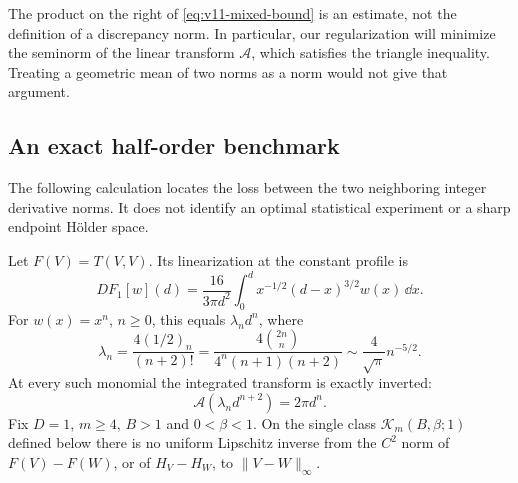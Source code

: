 The product on the right of \eqref{eq:v11-mixed-bound} is an estimate,
not the definition of a discrepancy norm. In particular, our
regularization will minimize the seminorm of the linear transform
$\mathscr A$, which satisfies the triangle inequality. Treating a
geometric mean of two norms as a norm would not give that argument.

\subsection{An exact half-order benchmark}
The following calculation locates the loss between the two neighboring
integer derivative norms. It does not identify an optimal statistical
experiment or a sharp endpoint H\"older space.

\begin{proposition}
\label{prop:v11-half-order}
Let $F(V)=T(V,V)$. Its linearization at the constant profile is
\begin{equation}\label{eq:v11-linearization}
 DF_1[w](d)=\frac{16}{3\pi d^2}
              \int_0^d x^{-1/2}(d-x)^{3/2}w(x)\,\dd x.
\end{equation}
For $w(x)=x^n$, $n\ge0$, this equals $\lambda_n d^n$, where
\begin{equation}\label{eq:v11-monomial}
 \lambda_n=\frac{4(1/2)_n}{(n+2)!}
  =\frac{4\binom{2n}{n}}{4^n(n+1)(n+2)}
                   \sim\frac4{\sqrt\pi}n^{-5/2}.
\end{equation}
At every such monomial the integrated transform is exactly inverted:
\begin{equation}\label{eq:v11-exact-linear-inverse}
               \mathscr A(\lambda_n d^{n+2})=2\pi d^n.
\end{equation}
Fix $D=1$, $m\ge4$, $B>1$ and $0<\beta<1$. On the single class
$\mathcal K_m(B,\beta;1)$ defined below there is no uniform Lipschitz
inverse from the $C^2$ norm of $F(V)-F(W)$, or of $H_V-H_W$, to
$\|V-W\|_\infty$.
\end{proposition}
